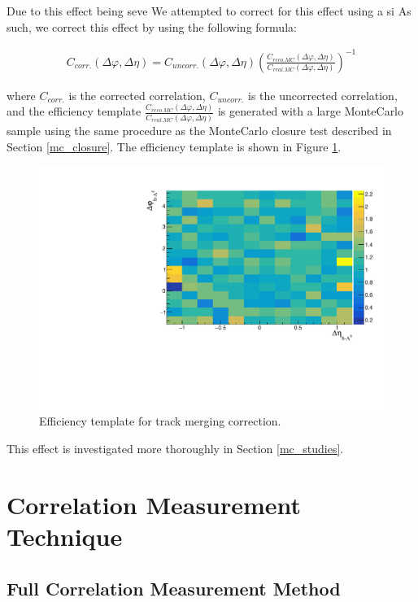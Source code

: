 \documentclass[ALICE,manyauthors]{ALICE_analysis_notes}
\begin{document}
Due to this effect being seve
We attempted to correct for this effect using a si As such, we correct this effect by using the following formula:

\begin{align*}
	C_{corr.}(\Delta\varphi, \Delta\eta) = C_{uncorr.}(\Delta\varphi, \Delta\eta)(\frac{C_{reco. MC}(\Delta\varphi, \Delta\eta)}{C_{real. MC}(\Delta\varphi, \Delta\eta)})^{-1}
\end{align*}

where $C_{corr.}$ is the corrected correlation, $C_{uncorr.}$ is the uncorrected correlation, and the efficiency template $\frac{C_{reco. MC}(\Delta\varphi, \Delta\eta)}{C_{real. MC}(\Delta\varphi, \Delta\eta)}$ is generated with a large MonteCarlo sample using the same procedure as the MonteCarlo closure test described in Section \ref{mc_closure}. The efficiency template is shown in Figure \ref{trackmerge_efficiency_plot}.


\begin{figure}[ht]
\centering
\includegraphics[width=5in]{figures/trackmerge_efficiency_PLACEHOLDER.pdf}
\caption{Efficiency template for track merging correction.}
\label{trackmerge_efficiency_plot}
\end{figure}

This effect is investigated more thoroughly in Section \ref{mc_studies}.

\section{Correlation Measurement Technique}
\label{corrsec}
\subsection{Full Correlation Measurement Method}
\end{document}
